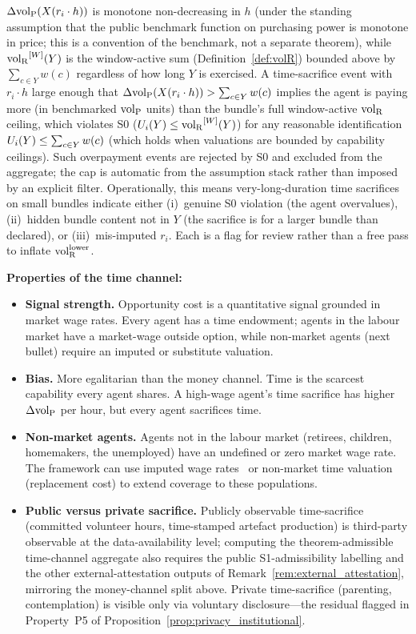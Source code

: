 \begin{remark}
\label{rem:s0_time_cap}
$\Delta{\operatorname{vol}_{\mathrm{P}}}(X(r_i \cdot h))$ is monotone non-decreasing in
$h$ (under the standing assumption that the public benchmark
function on purchasing power is monotone in price; this is a
convention of the benchmark, not a separate theorem), while
${\operatorname{vol}_{\mathrm{R}}}^{[W]}(Y)$ is the window-active sum
(Definition~\ref{def:volR}) bounded above by $\sum_{c \in Y}
w(c)$ regardless of how long $Y$ is exercised.  A time-sacrifice
event with $r_i \cdot h$ large enough that $\Delta{\operatorname{vol}_{\mathrm{P}}}(X(r_i
\cdot h)) > \sum_{c \in Y} w(c)$ implies the agent is paying
more (in benchmarked ${\operatorname{vol}_{\mathrm{P}}}$ units) than the bundle's full
window-active ${\operatorname{vol}_{\mathrm{R}}}$ ceiling, which violates S0
($U_i(Y) \leq {\operatorname{vol}_{\mathrm{R}}}^{[W]}(Y)$) for any reasonable identification
$U_i(Y) \leq \sum_{c \in Y} w(c)$ (which holds when valuations
are bounded by capability ceilings).  Such overpayment events
are rejected by S0 and excluded from the aggregate; the cap is
automatic from the assumption stack rather than imposed by an
explicit filter.  Operationally, this means very-long-duration
time sacrifices on small bundles indicate either (i)~genuine
S0 violation (the agent overvalues), (ii)~hidden bundle
content not in $Y$ (the sacrifice is for a larger bundle than
declared), or (iii)~mis-imputed $r_i$.  Each is a flag for
review rather than a free pass to inflate ${\operatorname{vol}_{\mathrm{R}}^{\mathrm{lower}}}$.
\end{remark}

\noindent\textbf{Properties of the time channel:}
\begin{itemize}
\item \textbf{Signal strength.}  Opportunity cost is a
  quantitative signal grounded in market wage rates.  Every
  agent has a time endowment; agents in the labour market have
  a market-wage outside option, while non-market agents
  (next bullet) require an imputed or substitute valuation.
\item \textbf{Bias.}  More egalitarian than the money channel.
  Time is the scarcest capability every agent shares.  A
  high-wage agent's time sacrifice has higher $\Delta{\operatorname{vol}_{\mathrm{P}}}$ per
  hour, but every agent sacrifices time.
\item \textbf{Non-market agents.}  Agents not in the labour
  market (retirees, children, homemakers, the unemployed) have
  an undefined or zero market wage rate.  The framework can use
  imputed wage rates~\citep{aguiar2007measuring} or non-market
  time valuation (replacement cost) to extend coverage to these
  populations.
\item \textbf{Public versus private sacrifice.}  Publicly
  observable time-sacrifice (committed volunteer hours,
  time-stamped artefact production) is third-party observable
  at the data-availability level; computing the
  theorem-admissible time-channel aggregate also requires the
  public S1-admissibility labelling and the other
  external-attestation outputs of
  Remark~\ref{rem:external_attestation}, mirroring the
  money-channel split above.  Private time-sacrifice (parenting,
  contemplation) is visible
  only via voluntary disclosure---the residual flagged in
  Property~P5 of Proposition~\ref{prop:privacy_institutional}.
\end{itemize}

